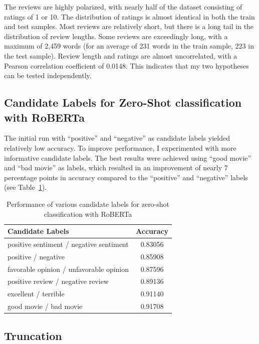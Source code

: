 \documentclass{article}
\begin{document}
The reviews are highly polarized, with nearly half of the dataset consisting of ratings of 1 or 10. The distribution of ratings is almost identical in both the train and test samples. Most reviews are relatively short, but there is a long tail in the distribution of review lengths. Some reviews are exceedingly long, with a maximum of 2,459 words (for an average of 231 words in the train sample, 223 in the test sample). Review length and ratings are almost uncorrelated, with a Pearson correlation coefficient of 0.0148. This indicates that my two hypotheses can be tested independently.

\subsection{Candidate Labels for Zero-Shot classification with RoBERTa}

The initial run with \enquote{positive} and \enquote{negative} as candidate labels yielded relatively low accuracy. To improve performance, I experimented with more informative candidate labels. The best results were achieved using \enquote{good movie} and \enquote{bad movie} as labels, which resulted in an improvement of nearly 7 percentage points in accuracy compared to the \enquote{positive} and \enquote{negative} labels (see Table~\ref{tab:labels_zero_shot}).

\begin{table}
  \centering
  \begin{tabular}{lc}
    \toprule
    \textbf{Candidate Labels} & \textbf{Accuracy} \\
    \midrule
    positive sentiment / negative sentiment & 0.83056 \\
    positive / negative & 0.85908 \\
    favorable opinion / unfavorable opinion & 0.87596 \\
    positive review / negative review & 0.89136 \\
    excellent / terrible & 0.91140 \\
    good movie / bad movie & 0.91708 \\
    \bottomrule
  \end{tabular}
  \vspace{0.5em}
  \caption{Performance of various candidate labels for zero-shot classification with RoBERTa}
  \label{tab:labels_zero_shot}
\end{table}

\subsection{Truncation}
\end{document}
